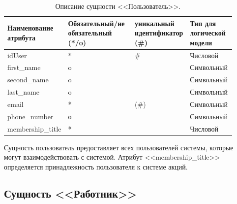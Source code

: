 \documentclass[14pt]{extreport}
\begin{document}
            \begin{table}[H]
                \caption{Описание сущности <<Пользователь>>.}
                \begin{tabular}{|p{0.225\linewidth}|p{0.3\linewidth}|p{0.2\linewidth}|p{0.2\linewidth}|}
                    \hline
                    Наименование атрибута & Обязательный/не обязательный (*/o) & уникальный идентификатор (\#) & Тип для логической модели
                    \\ \hline
                    idUser & * & \# & Числовой \\ \hline
                    first\_name & o & & Символьный\\ \hline
                    second\_name & o & & Символьный\\ \hline
                    last\_name & o & & Символьный \\ \hline
                    email & * & (\#) & Символьный  \\ \hline
                    phone\_number & о & & Символьный\\ \hline
                    membership\_title & * & & Числовой \\ \hline
                \end{tabular}

            \end{table}
        
        Сущность пользователь предоставляет всех пользователей системы,%
         которые могут взаимодействовать с системой. Атрибут <<membership\_title>> %
          определяется принадлежность пользователя к системе акций.
    
        \subsection*{Сущность <<Работник>>}
\end{document}
